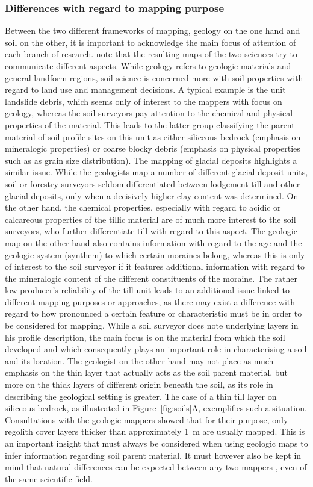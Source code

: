 \documentclass[preprint,12pt,authoryear]{elsarticle}
\begin{document}
\subsubsection{Differences with regard to mapping purpose}
Between the two different frameworks of mapping, geology on the one hand and soil on the other, it is important to acknowledge the main focus of attention of each branch of research. \cite{Miller2015a} note that the resulting maps of the two sciences try to communicate different aspects. While geology refers to geologic materials and general landform regions, soil science is concerned more with soil properties with regard to land use and management decisions. A typical example is the unit landslide debris, which seems only of interest to the mappers with focus on geology, whereas the soil surveyors pay attention to the chemical and physical properties of the material. This leads to the latter group classifying the parent material of soil profile sites on this unit as either siliceous bedrock (emphasis on mineralogic properties) or coarse blocky debris (emphasis on  physical properties such as as grain size distribution). The mapping of glacial deposits highlights a similar issue. While the geologists map a number of different glacial deposit units, soil or forestry surveyors seldom differentiated between lodgement till and other glacial deposits, only when a decisively higher clay content was determined. On the other hand, the chemical properties, especially with regard to acidic or calcareous properties of the tillic material are of much more interest to the soil surveyors, who further differentiate till with regard to this aspect. The geologic map on the other hand also contains information with regard to the age and the geologic system (synthem) to which certain moraines belong, whereas this is only of interest to the soil surveyor if it features additional information with regard to the mineralogic content of the different constituents of the moraine. The rather low producer's reliability  of the till unit leads to an additional issue linked to different mapping purposes or approaches, as there may exist a difference with regard to how pronounced a certain feature or characteristic must be in order to be considered for mapping. While a soil surveyor does note underlying layers in his profile description, the main focus is on the material from which the soil developed and which consequently plays an important role in characterising a soil and its location. The geologist on the other hand may not place as much emphasis on the thin layer that actually acts as the soil parent material, but more on the thick layers of different origin beneath the soil, as its role in describing the geological setting is greater. The case of a thin till layer on siliceous bedrock, as illustrated in Figure~\ref{fig:soils}A, exemplifies such a situation. Consultations with the geologic mappers showed that for their purpose, only regolith cover layers thicker than approximately 1~m are usually mapped. This is an important insight that must always be considered when using geologic maps to infer information regarding soil parent material. It must however also be kept in mind that natural differences can be expected between any two mappers \citep{Miller2015a}, even of the same scientific field.
\end{document}
